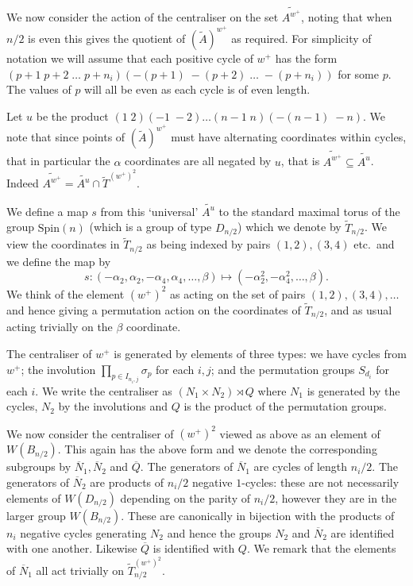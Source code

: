 \documentclass[11pt,a4paper]{article}
\def\Spin{\mathrm{Spin}}
\def\Atilde{(\widetilde{A})}
\def\coveringtorus{\tilde{T}}
\def\TSpinn{\coveringtorus_{n/2}}
\def\wplus{w^+}
\begin{document}
We now consider the action of the centraliser on the set $\widetilde{A^{\wplus}}$, noting that when $n/2$ is even this gives the quotient of $\Atilde^{\wplus}$ as required. For simplicity of notation we will assume that each positive cycle of $\wplus$ has the form $(p+1\; p+2\; \dots \;p+n_{i})(-(p+1)\; -(p+2)\; \dots \;-(p+n_{i}))$ for some $p$. The  values of $p$ will all be even as each cycle is of even length.

Let $u$ be the product $(1\;2)(-1\;-2)\dots(n-1\;n)(-(n-1)\;-n)$. We note that since points of $\Atilde^{\wplus}$ must have alternating coordinates within cycles, that in particular  the $\alpha$ coordinates are all negated by $u$, that is $\widetilde{A^{\wplus}}\subseteq\widetilde{A^{u}}$. Indeed $\widetilde{A^{\wplus}}=\widetilde{A^{u}} \cap \coveringtorus^{(\wplus)^2}$.

We define a map $s$ from this `universal' $\widetilde{A^u}$ to the standard maximal torus of the group $\Spin(n)$ (which is a group of type $D_{n/2}$) which we denote by $\TSpinn$. We view the coordinates in $\TSpinn$ as being indexed by pairs $(1,2),(3,4)$ etc.\ and we define the map by
\[
s:(-\alpha_2,\alpha_2,-\alpha_4,\alpha_4,\dots,\beta) \mapsto (-\alpha_2^2,-\alpha_4^2,\dots,\beta).
\]
We think of the element $(\wplus)^2$ as acting on the set of pairs $(1,2),(3,4),\dots$ and hence giving a permutation action on the coordinates of $\TSpinn$, and as usual acting trivially on the $\beta$ coordinate.


The centraliser of $\wplus$ is generated by elements of three types: we have cycles from $\wplus$; the involution $\prod_{p\in I_{n_i,j}} \sigma_p$ for each $i,j$; and the permutation groups $S_{d_i}$ for each $i$.  We write the centraliser as $(N_1\times N_2)\rtimes Q$ where $N_1$ is generated by the cycles, $N_2$ by the involutions and $Q$ is the product of the permutation groups.

We now consider the centraliser of $(\wplus)^2$ viewed as above as an element of $W(B_{n/2})$. This again has the above form and we denote the corresponding subgroups by $\overline{N}_1,\overline{N}_2$ and $\overline{Q}$. The generators of $\overline{N}_1$ are cycles of length $n_i/2$.  The generators of $\overline{N}_2$ are products of $n_i/2$ negative $1$-cycles: these are not necessarily elements of $W(D_{n/2})$ depending on the parity of $n_i/2$, however they are in the larger group $W(B_{n/2})$.  These are canonically in bijection with the products of $n_i$ negative cycles generating $N_2$ and hence the groups $N_2$ and $\overline{N}_2$ are identified with one another.  Likewise $\overline{Q}$ is identified with $Q$.  We remark that the elements of $\overline{N}_1$ all act trivially on $\TSpinn^{(\wplus)^2}$\!\!.
\end{document}
